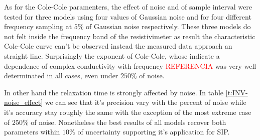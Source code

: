 \documentclass{vie16}
\newcommand{\att}[1]{\textcolor{red}{#1}}
\begin{document}
As for the Cole-Cole paramenters, the effect of noise and of sample interval were tested for three models using four values of Gaussian noise and for four different frequency sampling at $5\%$ of Gaussian noise respectively. These three models do not felt inside the frequency band of the resistivimeter as result the characteristic Cole-Cole curve can't be observed instead the measured data approach an straight line. Surprisingly the exponent of Cole-Cole, whose indicate a dependence of complex conductivity with frequency \att{REFERENCIA} was very well determinated in all cases, 
even under $250\%$ of noise.

In other hand the relaxation time is strongly affected by noise. In table \ref{t:INV-noise_effect} we can see that it's precision vary with the 
percent of noise while it's accuracy stay roughly the same with the exception of the most extreme case of $250\%$ of noise. Nonetheless the best 
results of all models recover both parameters within $10\%$ of uncertainty supporting it's application for SIP.
\end{document}
